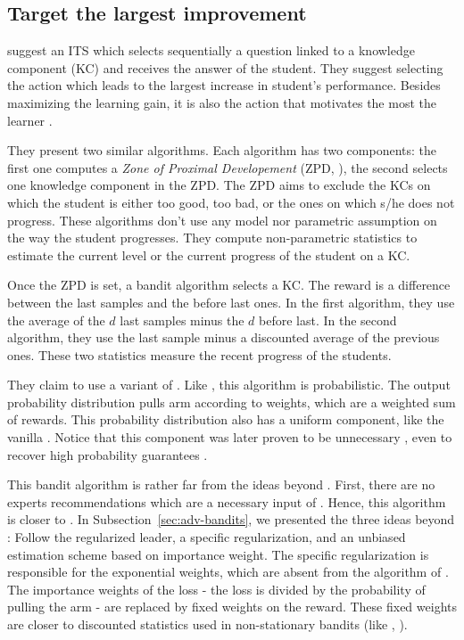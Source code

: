 \subsection{Target the largest improvement}
\citet{clement2015multi} suggest an ITS which selects sequentially a question linked to a knowledge component (KC) and receives the answer of the student. They suggest selecting the action which leads to the largest increase in student's performance. Besides maximizing the learning gain, it is also the action that motivates the most the learner \citep{gottlieb2013information}. 

They present two similar algorithms. Each algorithm has two components: the first one computes a \emph{Zone of Proximal Developement} (ZPD, \citet{luckin2001designing}), the second selects one knowledge component in the ZPD. The ZPD aims to exclude the KCs on which the student is either too good, too bad, or the ones on which s/he does not progress.  These algorithms don't use any model nor parametric assumption on the way the student progresses. They compute non-parametric statistics to estimate the current level or the current progress of the student on a KC.

Once the ZPD is set, a bandit algorithm selects a KC. The reward is a difference between the last samples and the before last ones. In the first algorithm, they use the average of the $d$ last samples minus the $d$ before last. In the second algorithm, they use the last sample minus a discounted average of the previous ones. These two statistics measure the recent progress of the students.

They claim to use a variant of \EXPfour \citep{auer2002nonstochastic}. Like \EXPfour, this algorithm is probabilistic. The output probability distribution pulls arm according to weights, which are a weighted sum of rewards. This probability distribution also has a uniform component, like the vanilla \EXPfour. Notice that this component was later proven to be unnecessary \citep{bubeck2012regret}, even to recover high probability guarantees \citep{neu2015explore}.

This bandit algorithm is rather far from the ideas beyond \EXPfour. First, there are no experts recommendations which are a necessary input of \EXPfour. Hence, this algorithm is closer to \EXP. In Subsection~\ref{sec:adv-bandits}, we presented the three ideas beyond \EXP: Follow the regularized leader, a specific regularization, and an unbiased estimation scheme based on importance weight. The specific regularization is responsible for the exponential weights, which are absent from the algorithm of \citet{clement2015multi}. The importance weights of the loss -  the loss is divided by the probability of pulling the arm - are replaced by fixed weights on the reward. These fixed weights are closer to discounted statistics used in non-stationary bandits (like \DUCB, \citet{kocsis2006discounted, garivier2011upper-confidence-bound}).

